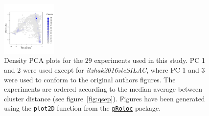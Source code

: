\documentclass[12pt]{article}\usepackage[]{graphicx}\usepackage[]{color}
\newcommand{\Rpackage}[1]{\texttt{#1}}
\newcommand\Biocpkg[1]{%
  {\href{http://bioconductor.org/packages/#1}%
    {\Rpackage{#1}}}}
\begin{document}
\begin{figure}[p]
  \includegraphics[width = 0.24\textwidth]{./figure/fighexpca-20.pdf}
  \caption{Density PCA plots for the 29 experiments
    used in this study. PC 1 and 2 were used except for
    \textit{itzhak2016stcSILAC}, where PC 1 and 3 were used to conform
    to the original authors figures. The experiments are ordered
    according to the median average between cluster distance (see
    figure~\ref{fig:qsep}). Figures have been generated using the
    \texttt{plot2D} function from the \Biocpkg{pRoloc} package.}
  \label{fig:denspca}
\end{figure}
\end{document}
